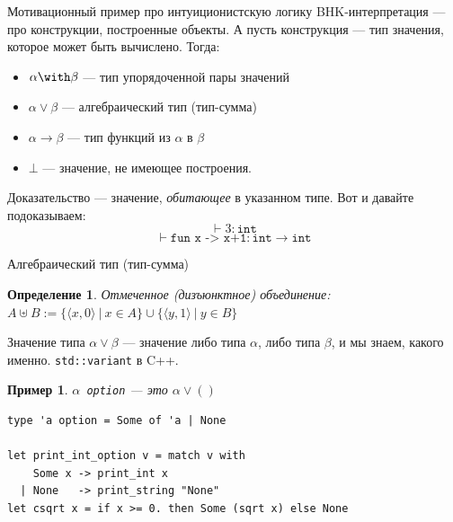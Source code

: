 \documentclass[aspectratio=169]{beamer}
\begin{document}
\newtheorem{axiom}{Аксиома}
\newtheorem{exmprus}{Пример}
\newtheorem{defrus}{Определение}
\newtheorem{lemmarus}{Лемма}
\newtheorem{thmrus}{Теорема}

\begin{frame}{Мотивационный пример про интуиционистскую логику}
BHK-интерпретация --- про конструкции, построенные объекты. А пусть конструкция --- тип значения,
которое может быть вычислено. Тогда:

\begin{itemize}
\item $\alpha\with\beta$ --- тип упорядоченной пары значений
\item $\alpha\vee\beta$ --- алгебраический тип (тип-сумма)
\item $\alpha\rightarrow\beta$ --- тип функций из $\alpha$ в $\beta$
\item $\bot$ --- значение, не имеющее построения.
\end{itemize}

Доказательство --- значение, \emph{обитающее} в указанном типе. Вот и давайте подоказываем:
$$\vdash 3 : \texttt{int}$$
$$\vdash \texttt{fun x -> x+1} : \texttt{int}\rightarrow\texttt{int}$$
\end{frame}

\begin{frame}[fragile]{Алгебраический тип (тип-сумма)}
\begin{defrus}Отмеченное (дизъюнктное) объединение: $A \uplus B := \{ \langle x, 0 \rangle\ |\ x \in A\} \cup \{ \langle y, 1\rangle\ |\ y \in B\}$\end{defrus}

Значение типа $\alpha\vee\beta$ --- значение либо типа $\alpha$, либо типа $\beta$, и мы знаем, какого именно. \verb!std::variant! в C++.

\begin{exmprus}$\alpha$\verb! option! --- это $\alpha\vee()$\end{exmprus}

\begin{verbatim}
type 'a option = Some of 'a | None

let print_int_option v = match v with
    Some x -> print_int x
  | None   -> print_string "None"
let csqrt x = if x >= 0. then Some (sqrt x) else None
\end{verbatim}

\end{frame}
\end{document}

